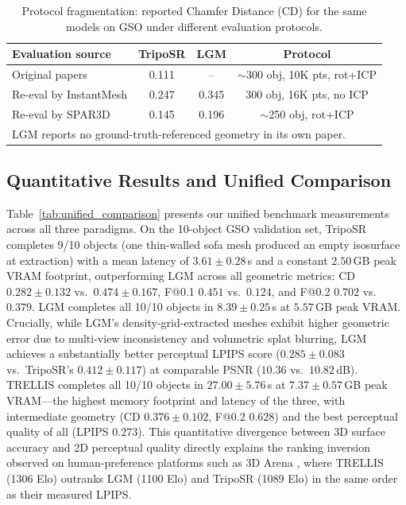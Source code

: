 \documentclass[10pt, conference]{IEEEtran}
\begin{document}
\begin{table}[ht]
\centering
\caption{Protocol fragmentation: reported Chamfer Distance (CD) for the same models on GSO under different evaluation protocols.}
\label{tab:protocol_fragmentation}
{\footnotesize\setlength{\tabcolsep}{2pt}
\begin{tabular}{lccc}
\toprule
Evaluation source & TripoSR & LGM & Protocol \\
\midrule
Original papers \cite{triposr2024,lgm2024} & 0.111 & -- & $\sim$300 obj, 10K pts, rot+ICP \\
Re-eval by InstantMesh \cite{instantmesh2024} & 0.247 & 0.345 & 300 obj, 16K pts, no ICP \\
Re-eval by SPAR3D \cite{spar3d2025} & 0.145 & 0.196 & $\sim$250 obj, rot+ICP \\
\bottomrule
\multicolumn{4}{l}{\footnotesize LGM reports no ground-truth-referenced geometry in its own paper.}
\end{tabular}}
\end{table}

\subsection{Quantitative Results and Unified Comparison}

Table~\ref{tab:unified_comparison} presents our unified benchmark measurements across all three paradigms. On the 10-object GSO validation set, TripoSR completes 9/10 objects (one thin-walled sofa mesh produced an empty isosurface at extraction) with a mean latency of $3.61 \pm 0.28$\,s and a constant $2.50$\,GB peak VRAM footprint, outperforming LGM across all geometric metrics: CD $0.282 \pm 0.132$ vs.\ $0.474 \pm 0.167$, F@0.1 $0.451$ vs.\ $0.124$, and F@0.2 $0.702$ vs.\ $0.379$. LGM completes all 10/10 objects in $8.39 \pm 0.25$\,s at $5.57$\,GB peak VRAM. Crucially, while LGM's density-grid-extracted meshes exhibit higher geometric error due to multi-view inconsistency and volumetric splat blurring, LGM achieves a substantially better perceptual LPIPS score ($0.285 \pm 0.083$ vs.\ TripoSR's $0.412 \pm 0.117$) at comparable PSNR ($10.36$ vs.\ $10.82$\,dB). TRELLIS completes all 10/10 objects in $27.00 \pm 5.76$\,s at $7.37 \pm 0.57$\,GB peak VRAM---the highest memory footprint and latency of the three, with intermediate geometry (CD $0.376 \pm 0.102$, F@0.2 $0.628$) and the best perceptual quality of all (LPIPS $0.273$). This quantitative divergence between 3D surface accuracy and 2D perceptual quality directly explains the ranking inversion observed on human-preference platforms such as 3D Arena \cite{arenad2025}, where TRELLIS (1306 Elo) outranks LGM (1100 Elo) and TripoSR (1089 Elo) in the same order as their measured LPIPS.
\end{document}
